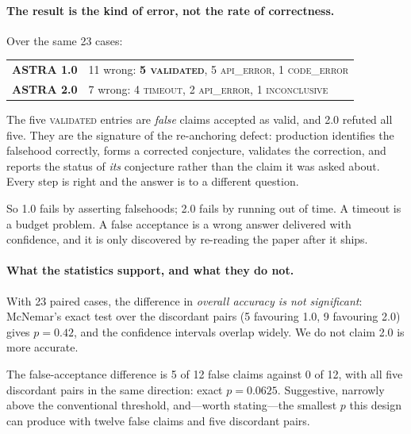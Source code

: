 \documentclass[11pt,a4paper]{article}
\begin{document}
\paragraph{The result is the kind of error, not the rate of correctness.}
Over the same 23 cases:

\begin{center}
\small
\begin{tabular}{@{}lp{9.4cm}@{}}
\toprule
\textbf{ASTRA 1.0} & 11 wrong: \textbf{5 \textsc{validated}}, 5 \textsc{api\_error}, 1 \textsc{code\_error} \\
\textbf{ASTRA 2.0} & 7 wrong: 4 \textsc{timeout}, 2 \textsc{api\_error}, 1 \textsc{inconclusive} \\
\bottomrule
\end{tabular}
\end{center}

The five \textsc{validated} entries are \emph{false} claims accepted as valid,
and 2.0 refuted all five. They are the signature of the re-anchoring defect:
production identifies the falsehood correctly, forms a corrected conjecture,
validates the correction, and reports the status of \emph{its} conjecture rather
than the claim it was asked about. Every step is right and the answer is to a
different question.

So 1.0 fails by asserting falsehoods; 2.0 fails by running out of time. A
timeout is a budget problem. A false acceptance is a wrong answer delivered with
confidence, and it is only discovered by re-reading the paper after it ships.

\paragraph{What the statistics support, and what they do not.} With 23 paired
cases, the difference in \emph{overall accuracy is not significant}: McNemar's
exact test over the discordant pairs (5 favouring 1.0, 9 favouring 2.0) gives
$p=0.42$, and the confidence intervals overlap widely. We do not claim 2.0 is
more accurate.

The false-acceptance difference is 5 of 12 false claims against 0 of 12, with
all five discordant pairs in the same direction: exact $p=0.0625$. Suggestive,
narrowly above the conventional threshold, and---worth stating---the smallest
$p$ this design can produce with twelve false claims and five discordant pairs.
\end{document}
